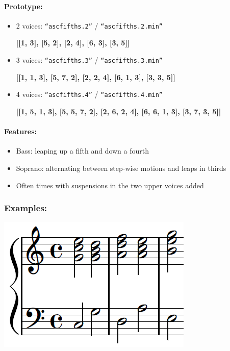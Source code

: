 \documentclass[11pt, openany]{article}
\begin{document}
\paragraph{Prototype:}
\begin{itemize}
\item 2 voices: \texttt{“ascfifths.2”} / \texttt{“ascfifths.2.min”}
	\begin{center}
    \textbf{[[1, 3], [5, 2], [2, 4], [6, 3], [3, 5]]}
    \end{center}
\item 3 voices: \texttt{“ascfifths.3”} / \texttt{“ascfifths.3.min”}
	\begin{center}
    \textbf{[[1, 1, 3], [5, 7, 2], [2, 2, 4], [6, 1, 3], [3, 3, 5]]}
    \end{center}
\item 4 voices: \texttt{“ascfifths.4”} / \texttt{“ascfifths.4.min”}
	\begin{center}
    \textbf{[[1, 5, 1, 3], [5, 5, 7, 2], [2, 6, 2, 4], [6, 6, 1, 3], [3, 7, 3, 5]]}
     \end{center}
\end{itemize}

\paragraph{Features:}
\begin{itemize}
\item Bass: leaping up a fifth and down a fourth
\item Soprano: alternating between step-wise motions and leaps in thirds
\item Often times with suspensions in the two upper voices added
\end{itemize}

\subsubsection{Examples:}
\begin{center}
\includegraphics[scale=0.5]{asc5th.png}
\end{center}
\end{document}
